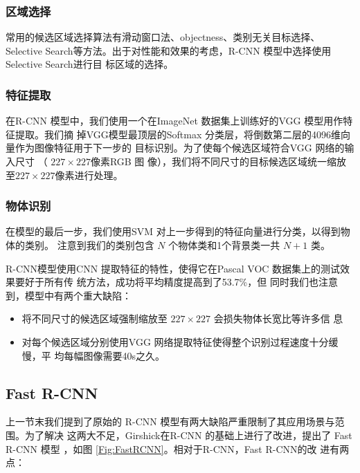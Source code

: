 \subsubsection{区域选择}

常用的候选区域选择算法有滑动窗口法、objectness、类别无关目标选择、Selective
Search等方法。出于对性能和效果的考虑，R-CNN 模型中选择使用 Selective Search进行目
标区域的选择。

\subsubsection{特征提取}

在R-CNN 模型中，我们使用一个在ImageNet 数据集上训练好的VGG 模型用作特征提取。我们摘
掉VGG模型最顶层的Softmax 分类层，将倒数第二层的4096维向量作为图像特征用于下一步的
目标识别。为了使每个候选区域符合VGG 网络的输入尺寸 （ $227 \times 227$像素RGB 图
像），我们将不同尺寸的目标候选区域统一缩放至$227 \times 227$像素进行处理。

\subsubsection{物体识别}

在模型的最后一步，我们使用SVM 对上一步得到的特征向量进行分类，以得到物体的类别。
注意到我们的类别包含 $N$ 个物体类和1个背景类一共 $N+1$ 类。

R-CNN模型使用CNN 提取特征的特性，使得它在Pascal VOC 数据集上的测试效果要好于所有传
统方法，成功将平均精度提高到了53.7\%\cite{Girshick:2014jx}，但
同时我们也注意到，模型中有两个重大缺陷：

\begin{itemize}
  \item 将不同尺寸的候选区域强制缩放至 $227 \times 227$ 会损失物体长宽比等许多信
    息
  \item 对每个候选区域分别使用VGG 网络提取特征使得整个识别过程速度十分缓慢，平
     均每幅图像需要40s之久\cite{Girshick:2014jx}。
\end{itemize}

\subsection{Fast R-CNN}

上一节末我们提到了原始的 R-CNN 模型有两大缺陷严重限制了其应用场景与范围。为了解决
这两大不足，Girshick在R-CNN 的基础上进行了改进，提出了 Fast R-CNN 模型
\cite{Girshick:2015ib}，如图 \ref{Fig:FastRCNN}。相对于R-CNN，Fast R-CNN的改
进有两点：

